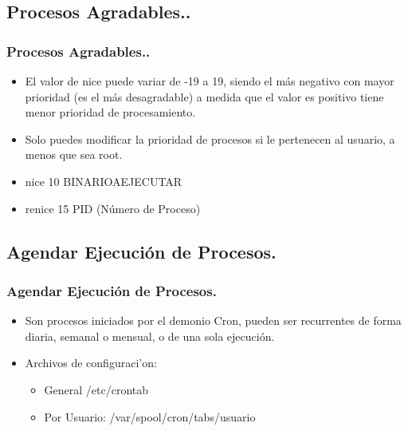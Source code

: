\documentclass{beamer}
\begin{document}
\subsection{Procesos Agradables..}
\begin{frame}
\frametitle{Procesos Agradables..}
\begin{itemize}
\item El valor de nice puede variar de -19 a 19, siendo el m\'as negativo con mayor prioridad (es el m\'as desagradable) a medida que el valor es positivo tiene menor prioridad de procesamiento.
\item Solo puedes modificar la prioridad de procesos si le pertenecen al usuario, a menos que sea root.
\item nice 10 BINARIOAEJECUTAR
\item renice 15 PID (N\'umero de Proceso)
\end{itemize}
\end{frame}


\subsection{Agendar Ejecuci\'on de Procesos.}
\begin{frame}
\frametitle{Agendar Ejecuci\'on de Procesos.}
\begin{itemize}
\item Son procesos iniciados por el demonio Cron, pueden ser recurrentes de forma diaria, semanal o mensual, o de una sola ejecuci\'on.
\item Archivos de configuraci'on:
        \begin{itemize}
        \item General /etc/crontab
        \item Por Usuario: /var/spool/cron/tabs/usuario
        \end{itemize}
\end{itemize}
\end{frame}
\end{document}
